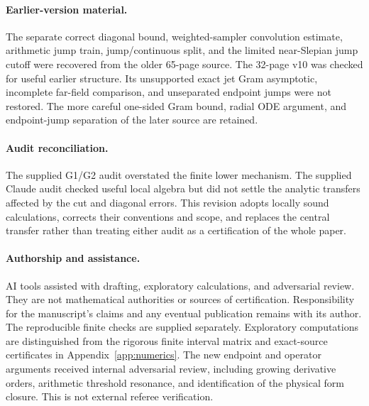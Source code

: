 \documentclass[11pt]{article}
\theoremstyle{remark}
\begin{document}
\paragraph{Earlier-version material.}
The separate correct diagonal bound, weighted-sampler convolution estimate,
arithmetic jump train, jump/continuous split, and the limited near-Slepian
jump cutoff were recovered from the older 65-page source. The 32-page v10
was checked for useful earlier structure. Its unsupported exact jet
Gram asymptotic, incomplete far-field comparison, and unseparated endpoint
jumps were not restored. The more careful one-sided Gram bound, radial ODE
argument, and endpoint-jump separation of the later source are retained.

\paragraph{Audit reconciliation.}
The supplied G1/G2 audit overstated the finite lower mechanism. The supplied
Claude audit checked useful local algebra but did not settle the analytic
transfers affected by the cut and diagonal errors. This revision adopts
locally sound calculations, corrects their conventions and scope, and
replaces the central transfer rather than treating either audit as a
certification of the whole paper.

\paragraph{Authorship and assistance.}
AI tools assisted with drafting, exploratory calculations, and adversarial
review. They are not mathematical authorities or sources of certification.
Responsibility for the manuscript's claims and any eventual publication
remains with its author. The reproducible finite checks are supplied separately. Exploratory
computations are distinguished from the rigorous finite interval
matrix and exact-source certificates in Appendix~\ref{app:numerics}.
The new endpoint and operator arguments received internal adversarial
review, including growing derivative orders, arithmetic threshold
resonance, and identification of the physical form closure. This is
not external referee verification.
\end{document}
